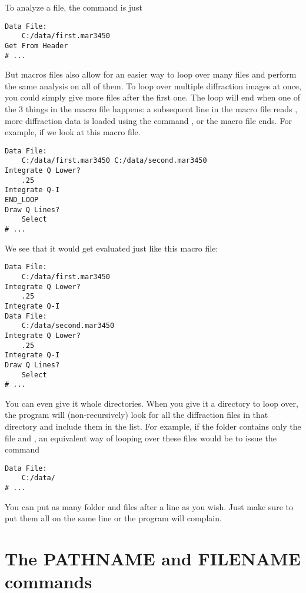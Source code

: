 To analyze a file, the command is just 
\begin{lstlisting}[caption={'Load the Diffraction Data'}]
Data File:
    C:/data/first.mar3450
Get From Header
# ...
\end{lstlisting}
But macros files also allow for an easier way
to loop over many files and perform the same
analysis on all of them.  
To loop over multiple diffraction images at once,
you could simply give more files after the first 
one. The loop will end when 
one of the 3 things in the macro 
file happens: a subsequent line in the macro
file reads , more diffraction data
is loaded using the command , or
the macro file ends. For example, if we look at this 
macro file.
\begin{lstlisting}[caption={'Loop Over Diffraction Data'}]
Data File:
    C:/data/first.mar3450 C:/data/second.mar3450 
Integrate Q Lower?
    .25
Integrate Q-I
END_LOOP
Draw Q Lines?
    Select
# ...
\end{lstlisting}
We see that it would get evaluated just like this
macro file:
\begin{lstlisting}[caption={'An Equivalent Macro'}]
Data File:
    C:/data/first.mar3450 
Integrate Q Lower?
    .25
Integrate Q-I
Data File:
    C:/data/second.mar3450 
Integrate Q Lower?
    .25
Integrate Q-I
Draw Q Lines?
    Select
# ...
\end{lstlisting}
You can even give it whole directories. When
you give it a directory to loop over, the program 
will (non-recursively) look for all the diffraction 
files in that directory and include them in the list. 
For example, if the folder  contains
only the file  and
, an equivalent way of looping
over these files would be to issue the command
\begin{lstlisting}[caption={'Load the Diffraction Data'}]
Data File:
    C:/data/
# ...
\end{lstlisting}
You can put as many folder and files after a 
 line as you wish.
Just make sure to put them all on the same line 
or the program will complain.

\section{The PATHNAME and FILENAME commands}

